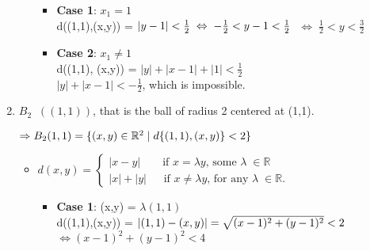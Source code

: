 \documentclass[12pt]{article}
\begin{document}
\begin{enumerate}[label=(\roman*)]
\begin{itemize}
    \begin{itemize}
        \item \textbf{Case 1}: $x_1 = 1$\\
        
        d((1,1),(x,y)) = $|y-1| < \frac{1}{2}\\ 
        \;\Leftrightarrow\; -\frac{1}{2} < y - 1 < \frac{1}{2}$
        $\; \Leftrightarrow\; \frac{1}{2} < y < \frac{3}{2}$\\
        
        \item \textbf{Case 2}: $x_1 \neq 1$\\
        
        d((1,1), (x,y)) = $|y| + |x-1| + |1| < \frac{1}{2}$\\
        $|y| + |x-1| < -\frac{1}{2}$, which is impossible.
    \end{itemize}
    
    \end{itemize}
    
    \newpage
    \item $B_{2}\;\;((1,1))$, that is the ball of radius 2 centered at (1,1).
    
    $\Rightarrow B_{2}(1,1) = \{(x,y) \in \mathbb{R}^2\;|\; d\{(1,1), (x,y)\} < 2\}\\$
    
    \begin{itemize}
        \item 
            $
        d(x,y) = 
        \begin{cases}
            |x-y| \qquad \text{if $x = \lambda y$, some $\lambda \; \in \mathbb{R}$}\\
            |x| + |y| \quad\;\; \text{if $x \neq \lambda y$, for any $\lambda\;\in\mathbb{R}$}.

        \end{cases}
        $\\
        
        
        \begin{itemize}
            \item \textbf{Case 1}: (x,y) = $\lambda(1,1)$\\
            
            d((1,1),(x,y)) = $|(1,1) - (x,y)|\\
            = \sqrt{(x-1)^2 + (y-1)^2} < 2$\\
            $\Leftrightarrow (x-1)^2 + (y-1)^2 < 4$\\
            

\end{itemize}
\end{itemize}
\end{enumerate}
\end{document}
